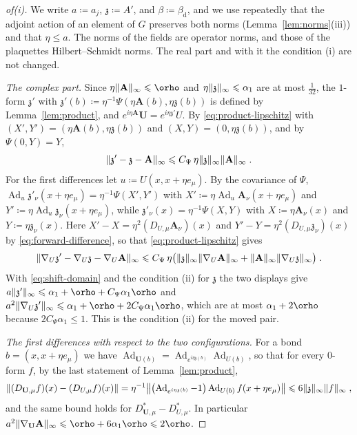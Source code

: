 \documentclass[11pt]{preprint}
\let\rho\orho
\newcommand{\Ad}{\operatorname{Ad}}
\DeclarePairedDelimiter{\norm}{\lVert}{\rVert}
\numberwithin{equation}{section}
\begin{document}
\begin{proof}[of(i)]
We write $a \coloneqq a_j$, $\mathfrak z \coloneqq A'$, and $\beta \coloneqq \beta_{\mathrm d}$, and we use repeatedly that the adjoint action of an element of $G$ preserves both norms (Lemma~\ref{lem:norms}(iii)) and that $\eta \leqslant a$. The norms of the fields are operator norms, and those of the plaquettes Hilbert--Schmidt norms. The real part and with it the condition (i) are not changed.

\emph{The complex part.} Since $\eta\norm{\mathbf A}_\infty \leqslant \rho$ and $\eta\norm{\mathfrak z}_\infty \leqslant \alpha_1$ are at most $\frac{1}{32}$, the $1$-form $\mathfrak z'$ with $\mathfrak z'(b) \coloneqq \eta^{-1}\Psi(\eta\mathbf A(b), \eta\mathfrak z(b))$ is defined by Lemma~\ref{lem:product}, and $e^{i\eta\mathbf A}\mathbf U = e^{i\eta\mathfrak z'}U$. By \eqref{eq:product-lipschitz} with $(X', Y') = (\eta\mathbf A(b), \eta\mathfrak z(b))$ and $(X, Y) = (0, \eta\mathfrak z(b))$, and by $\Psi(0, Y) = Y$,
\[
    \norm{\mathfrak z' - \mathfrak z - \mathbf A}_\infty \leqslant C_\Psi\,\eta\norm{\mathfrak z}_\infty\norm{\mathbf A}_\infty\;.
\]
For the first differences let $u \coloneqq U(x, x + \eta e_\mu)$. By the covariance of $\Psi$, $\Ad_u\mathfrak z'_\nu(x + \eta e_\mu) = \eta^{-1}\Psi(X', Y')$ with $X' \coloneqq \eta \Ad_u\mathbf A_\nu(x + \eta e_\mu)$ and $Y' \coloneqq \eta \Ad_u\mathfrak z_\nu(x + \eta e_\mu)$, while $\mathfrak z'_\nu(x) = \eta^{-1}\Psi(X, Y)$ with $X \coloneqq \eta\mathbf A_\nu(x)$ and $Y \coloneqq \eta\mathfrak z_\nu(x)$. Here $X' - X = \eta^2(D_{U,\mu}\mathbf A_\nu)(x)$ and $Y' - Y = \eta^2(D_{U,\mu}\mathfrak z_\nu)(x)$ by \eqref{eq:forward-difference}, so that \eqref{eq:product-lipschitz} gives
\[
    \norm{\nabla_U\mathfrak z' - \nabla_U\mathfrak z - \nabla_U\mathbf A}_\infty \leqslant C_\Psi\,\eta\bigl(\norm{\mathfrak z}_\infty\norm{\nabla_U\mathbf A}_\infty + \norm{\mathbf A}_\infty\norm{\nabla_U\mathfrak z}_\infty\bigr)\;.
\]
With \eqref{eq:shift-domain} and the condition (ii) for $\mathfrak z$ the two displays give $a\norm{\mathfrak z'}_\infty \leqslant \alpha_1 + \rho + C_\Psi\alpha_1\rho$ and $a^2\norm{\nabla_U\mathfrak z'}_\infty \leqslant \alpha_1 + \rho + 2C_\Psi\alpha_1\rho$, which are at most $\alpha_1 + 2\rho$ because $2C_\Psi\alpha_1 \leqslant 1$. This is the condition (ii) for the moved pair.

\emph{The first differences with respect to the two configurations.} For a bond $b = (x, x + \eta e_\mu)$ we have $\Ad_{\mathbf U(b)} = \Ad_{e^{i\eta\mathfrak z(b)}}\Ad_{U(b)}$, so that for every $0$-form $f$, by the last statement of Lemma~\ref{lem:product},
\begin{equation}\label{eq:difference-of-differences}
    \norm{(D_{\mathbf U,\mu}f)(x) - (D_{U,\mu}f)(x)} = \eta^{-1}\bigl\lVert\bigl(\Ad_{e^{i\eta\mathfrak z(b)}} - 1\bigr)\Ad_{U(b)}f(x + \eta e_\mu)\bigr\rVert \leqslant 6\norm{\mathfrak z}_\infty\norm f_\infty\;,
\end{equation}
and the same bound holds for $D^*_{\mathbf U,\mu} - D^*_{U,\mu}$. In particular $a^2\norm{\nabla_{\mathbf U}\mathbf A}_\infty \leqslant \rho + 6\alpha_1\rho \leqslant 2\rho$.


\end{proof}
\end{document}
